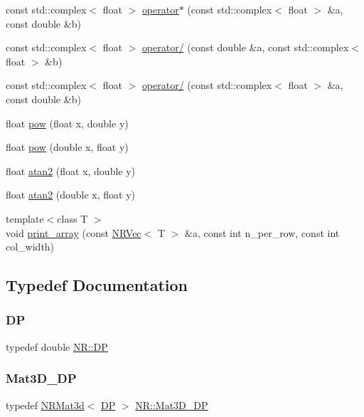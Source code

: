 \begin{DoxyCompactItemize}
const std\+::complex$<$ float $>$ \mbox{\hyperlink{namespaceNR_a39e0a171e9227121881368e4c636fd97}{operator$\ast$}} (const std\+::complex$<$ float $>$ \&a, const double \&b)
\item 
const std\+::complex$<$ float $>$ \mbox{\hyperlink{namespaceNR_a3b52a0a9d6e4087547b3be89ce0c646b}{operator/}} (const double \&a, const std\+::complex$<$ float $>$ \&b)
\item 
const std\+::complex$<$ float $>$ \mbox{\hyperlink{namespaceNR_a56ac51a96939b7cb972bb84871a7dce4}{operator/}} (const std\+::complex$<$ float $>$ \&a, const double \&b)
\item 
float \mbox{\hyperlink{namespaceNR_a519f9a284cc5f48e57acafa04ad862df}{pow}} (float x, double y)
\item 
float \mbox{\hyperlink{namespaceNR_a7d26b090a44a3b527619df12b89923c9}{pow}} (double x, float y)
\item 
float \mbox{\hyperlink{namespaceNR_afbe2717cf898de31cf6e00b84bfc3e8f}{atan2}} (float x, double y)
\item 
float \mbox{\hyperlink{namespaceNR_a2f18cc48b4090d59c9cfdcb2ecc45e20}{atan2}} (double x, float y)
\item 
{\footnotesize template$<$class T $>$ }\\void \mbox{\hyperlink{namespaceNR_abdbf6d4f445b801d09e550474f942b00}{print\+\_\+array}} (const \mbox{\hyperlink{classNR_1_1NRVec}{N\+R\+Vec}}$<$ T $>$ \&a, const int n\+\_\+per\+\_\+row, const int col\+\_\+width)
\end{DoxyCompactItemize}


\subsection{Typedef Documentation}
\mbox{\label{namespaceNR_af6ff762dd605ff477b8e52387253a02a}} 
\subsubsection{\texorpdfstring{DP}{DP}}
{\footnotesize\ttfamily typedef double \mbox{\hyperlink{namespaceNR_af6ff762dd605ff477b8e52387253a02a}{N\+R\+::\+DP}}}

\mbox{\label{namespaceNR_a64c9c5cd3e465fce99c1068a62bbc9d3}} 
\subsubsection{\texorpdfstring{Mat3D\_DP}{Mat3D\_DP}}
{\footnotesize\ttfamily typedef \mbox{\hyperlink{classNR_1_1NRMat3d}{N\+R\+Mat3d}}$<$ \mbox{\hyperlink{namespaceNR_af6ff762dd605ff477b8e52387253a02a}{DP}} $>$ \mbox{\hyperlink{namespaceNR_a64c9c5cd3e465fce99c1068a62bbc9d3}{N\+R\+::\+Mat3\+D\+\_\+\+DP}}}

